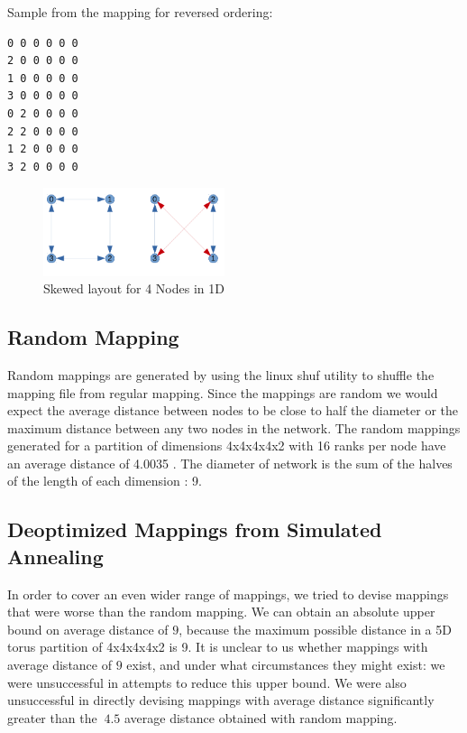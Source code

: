 \documentclass{acm_proc_article-sp}
\begin{document}
Sample from the mapping for reversed ordering:
\begin{lstlisting}[frame=lines, basicstyle=\ttfamily,columns=fixed]
0 0 0 0 0 0
2 0 0 0 0 0
1 0 0 0 0 0
3 0 0 0 0 0
0 2 0 0 0 0
2 2 0 0 0 0
1 2 0 0 0 0
3 2 0 0 0 0
\end{lstlisting}


\begin{figure}
  \center
  \includegraphics[width=0.475\textwidth]{skewed_layout_cropped.pdf}
  \caption{Skewed layout for 4 Nodes in 1D}
    \label{fig:Skewed_layout_for_4_Nodes_in_1D}
\end{figure}

\subsection{Random Mapping}
\label{sect:random}

Random mappings are generated by using the linux shuf utility to shuffle the mapping file from regular mapping.
Since the mappings are random we would expect the average distance between nodes to be close to half the diameter
or the maximum distance between any two nodes in the network. The random mappings generated for a partition of
dimensions 4x4x4x4x2 with 16 ranks per node have an average distance of 4.0035 .
The diameter of network is the sum of the halves of the length of each dimension : 9.


\subsection{Deoptimized Mappings from Simulated Annealing}
In order to cover an even wider range of mappings, we tried to
devise mappings that were worse than the random mapping.
We can obtain an absolute upper bound on average distance of
$9$, because the maximum possible distance in a 5D torus
partition of 4x4x4x4x2 is 9.  It is unclear to us whether
mappings with average distance of $9$ exist, and under what
circumstances they might exist: we were unsuccessful in
attempts to reduce this upper bound.  We were also
unsuccessful in directly devising mappings
with average distance significantly greater than the $~4.5$ average
distance obtained with random mapping.
\end{document}
